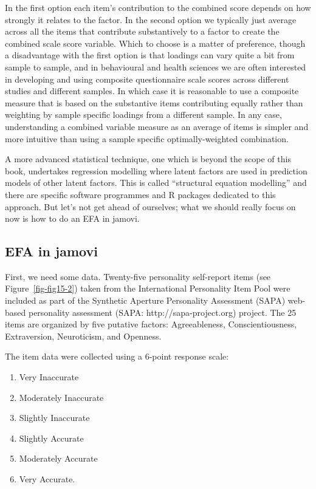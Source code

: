 \documentclass[
  a4paper,
]{book}
\providecommand{\tightlist}{%
  \setlength{\itemsep}{0pt}\setlength{\parskip}{0pt}}\usepackage{longtable,booktabs,array}
\begin{document}
In the first option each item's contribution to the combined score
depends on how strongly it relates to the factor. In the second option
we typically just average across all the items that contribute
substantively to a factor to create the combined scale score variable.
Which to choose is a matter of preference, though a disadvantage with
the first option is that loadings can vary quite a bit from sample to
sample, and in behavioural and health sciences we are often interested
in developing and using composite questionnaire scale scores across
different studies and different samples. In which case it is reasonable
to use a composite measure that is based on the substantive items
contributing equally rather than weighting by sample specific loadings
from a different sample. In any case, understanding a combined variable
measure as an average of items is simpler and more intuitive than using
a sample specific optimally-weighted combination.

A more advanced statistical technique, one which is beyond the scope of
this book, undertakes regression modelling where latent factors are used
in prediction models of other latent factors. This is called
``structural equation modelling'' and there are specific software
programmes and R packages dedicated to this approach. But let's not get
ahead of ourselves; what we should really focus on now is how to do an
EFA in jamovi.

\hypertarget{efa-in-jamovi}{%
\subsection{EFA in jamovi}\label{efa-in-jamovi}}

First, we need some data. Twenty-five personality self-report items (see
Figure~\ref{fig-fig15-2}) taken from the International Personality Item
Pool were included as part of the Synthetic Aperture Personality
Assessment (SAPA) web-based personality assessment (SAPA:
http://sapa-project.org) project. The 25 items are organized by five
putative factors: Agreeableness, Conscientiousness, Extraversion,
Neuroticism, and Openness.

The item data were collected using a 6-point response scale:

\begin{enumerate}
\def\labelenumi{\arabic{enumi}.}
\tightlist
\item
  Very Inaccurate
\item
  Moderately Inaccurate
\item
  Slightly Inaccurate
\item
  Slightly Accurate
\item
  Moderately Accurate
\item
  Very Accurate.
\end{enumerate}
\end{document}
